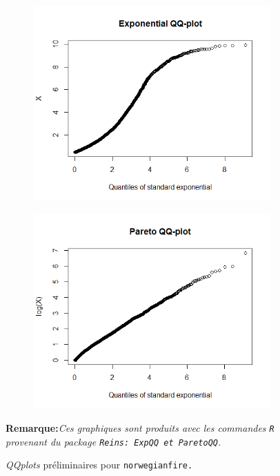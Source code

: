 			\begin{figure}[H]
			\begin{center}
					\begin{subfigure}[H]{0.45\textwidth}
						\includegraphics[scale=0.45]{Graphiques/QQplot_Exp_NorwegianFire}
						\caption{} \label{QQplot_Exp_NorwegianFire}
					\end{subfigure}
					\begin{subfigure}[H]{0.4\textwidth}
						\includegraphics[scale=0.45]{Graphiques/QQplot_Pareto_NorweginaFIre}
						\caption{} \label{QQplot_Pareto_NorweginaFIre}
					\end{subfigure}
				\renewcommand{\figurename}{Illustration}
				\caption{\textit{QQplots} préliminaires pour \texttt{norwegianfire.}}
				\end{center}
			\textbf{Remarque:}\textit{Ces graphiques sont produits avec les commandes \texttt{R} provenant du \textit{package} \texttt{Reins: ExpQQ et ParetoQQ}.}
			\end{figure}

